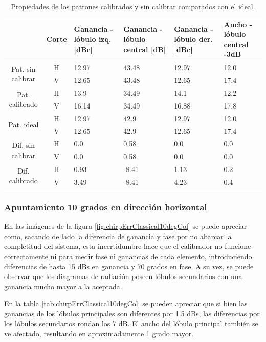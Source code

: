 \begin{table}[H]
  \footnotesize
  \centering
  \begin{tabular}{|c|c|p{2cm}|p{2.5cm}|p{2.5cm}|p{2.5cm}|}
    \cline{2-6}
    \multicolumn{1}{c|}{} & Corte & Ganancia - lóbulo izq. [dBc] & Ganancia - lóbulo central [dB] &
    Ganancia - lóbulo der. [dBc] & Ancho - lóbulo central -3dB \tabularnewline\hline
    \multirow{2}{2cm}{Pat. sin calibrar} & H & 12.97 & 43.48 & 12.97 & 12.0 \tabularnewline\cline{2-6}
     & V & 12.65 & 43.48 & 12.65 & 17.4 \tabularnewline\hline
    \multirow{2}{2cm}{Pat. calibrado} & H & 13.9 & 34.49 & 14.1 & 12.2 \tabularnewline\cline{2-6}
     & V & 16.14 & 34.49 & 16.88 & 17.8 \tabularnewline\hline
    \multirow{2}{2cm}{Pat. ideal} & H & 12.97 & 42.9 & 12.97 & 12.0 \tabularnewline\cline{2-6}
     & V & 12.65 & 42.9 & 12.65 & 17.4 \tabularnewline\hline
    \multirow{2}{2cm}{Dif. sin calibrar} & H & 0.0 & 0.58 & 0.0 & 0.0\tabularnewline\cline{2-6}
     & V & 0.0 & 0.58 & 0.0 & 0.0 \tabularnewline\hline
    \multirow{2}{2cm}{Dif. calibrado} & H & 0.93 & -8.41 & 1.13 & 0.2 \tabularnewline\cline{2-6}
     & V & 3.49 & -8.41 & 4.23 & 0.4 \tabularnewline\hline
  \end{tabular}
  \caption{Propiedades de los patrones calibrados y sin calibrar comparados con el ideal.}
  \label{tab:chirpErrClassical0deg}
\end{table}


\subsubsection{Apuntamiento 10 grados en dirección horizontal}

En las imágenes de la figura \ref{fig:chirpErrClassical10degCol} se puede apreciar como, sacando de lado la diferencia de 
ganancia y fase por no abarcar la completitud del sistema, esta incertidumbre hace que el calibrador no funcione correctamente 
ni para medir fase ni ganancias de cada elemento, introduciendo diferencias de hasta 15 dBs en ganancia y 70 grados en fase. 
A su vez, se puede observar que los diagramas de radiación poseen lóbulos secundarios con una ganancia mucho mayor a la aceptada.

En la tabla \ref{tab:chirpErrClassical10degCol} se pueden apreciar que si bien las ganancias de los lóbulos principales son 
diferentes por 1.5 dBs, las diferencias por los lóbulos secundarios rondan los 7 dB. El ancho del lóbulo principal también 
se ve afectado, resultando en aproximadamente 1 grado mayor.

